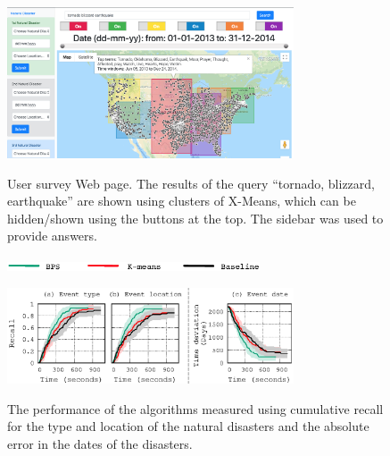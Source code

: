 \begin{figure}[t]
\begin{centering}
{\includegraphics[width=8.5cm]{imgs/kmeans}}
\par\end{centering}
\caption{User survey Web page. The results of the query ``tornado, blizzard, earthquake''  are shown using clusters of X-Means, which can be hidden/shown using the buttons at the top. The sidebar was used to provide answers.}
\label{fig:ScreenShot}
\end{figure}

\begin{figure}[t]
\begin{centering}
\includegraphics[width=7.5cm]{imgs/legend3}
\par\end{centering}
\begin{centering}
{\includegraphics[width=8.5cm]{imgs/nd_recall}}
\par\end{centering}
\caption{The performance of the algorithms measured using cumulative recall for the type and location of the natural disasters and the absolute error in the dates of the disasters.}
\label{fig:UserSurveyRecall}
\end{figure}




